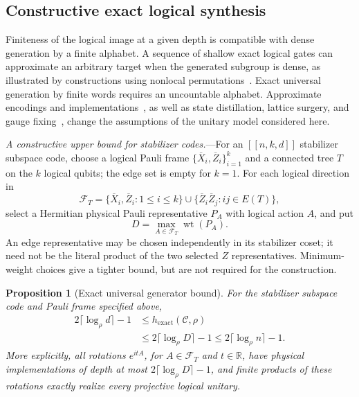 \documentclass[aps,prl,reprint,notitlepage,nofootinbib,nobibnotes]{revtex4-2}
\newtheorem{proposition}{Proposition}
\begin{document}
\subsection*{Constructive exact logical synthesis}

Finiteness of the logical image at a given depth is compatible with dense generation by a finite alphabet. A sequence of shallow exact logical gates can approximate an arbitrary target when the generated subgroup is dense, as illustrated by constructions using nonlocal permutations~\cite{ZhuLavasaniBarkeshli}. Exact universal generation by finite words requires an uncountable alphabet. Approximate encodings and implementations~\cite{Faist,WoodsAlhambra,KubicaDemkowicz,ZhouLiuJiang,LiuZhou}, as well as state distillation, lattice surgery, and gauge fixing~\cite{BravyiKitaev,Horsman,PaetznickReichardt,BombinGauge,Webster}, change the assumptions of the unitary model considered here.

\textit{A constructive upper bound for stabilizer codes.}---For an \([[n,k,d]]\) stabilizer subspace code, choose a logical Pauli frame \(\{\overline X_i,\overline Z_i\}_{i=1}^k\) and a connected tree \(T\) on the \(k\) logical qubits; the edge set is empty for \(k=1\). For each logical direction in
\begin{equation}\label{eq:logical-frame-set}
 \mathcal F_T=
 \{\overline X_i,\overline Z_i:1\le i\le k\}
 \cup\{\overline Z_i\overline Z_j:ij\in E(T)\},
\end{equation}
select a Hermitian physical Pauli representative \(P_A\) with logical action \(A\), and put
\begin{equation}\label{eq:frame-weight}
 D=\max_{A\in\mathcal F_T}\operatorname{wt}(P_A).
\end{equation}
An edge representative may be chosen independently in its stabilizer coset; it need not be the literal product of the two selected \(Z\) representatives. Minimum-weight choices give a tighter bound, but are not required for the construction.

\begin{proposition}[Exact universal generator bound]\label{prop:exact-upper}
For the stabilizer subspace code and Pauli frame specified above,
\begin{align}
 2\lceil\log_\rho d\rceil-1
 &\le h_{\mathrm{exact}}(\mathcal C,\rho)\nonumber\\
 &\le 2\lceil\log_\rho D\rceil-1
 \le 2\lceil\log_\rho n\rceil-1.
 \label{eq:exact-upper}
\end{align}
More explicitly, all rotations \(e^{itA}\), for \(A\in\mathcal F_T\) and \(t\in\mathbb R\), have physical implementations of depth at most \(2\lceil\log_\rho D\rceil-1\), and finite products of these rotations exactly realize every projective logical unitary.
\end{proposition}
\end{document}
